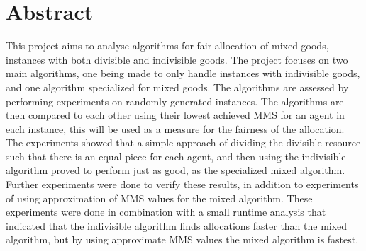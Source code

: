 \chapter{Abstract}\label{chp:abstract}

This project aims to analyse algorithms for fair allocation of mixed goods, instances with both divisible and indivisible goods. The project focuses on two main algorithms, one being made to only handle instances with indivisible goods, and one algorithm specialized for mixed goods. The algorithms are assessed by performing experiments on randomly generated instances. The algorithms are then compared to each other using their lowest achieved MMS for an agent in each instance, this will be used as a measure for the fairness of the allocation. The experiments showed that a simple approach of dividing the divisible resource such that there is an equal piece for each agent, and then using the indivisible algorithm proved to perform just as good, as the specialized mixed algorithm. Further experiments were done to verify these results, in addition to experiments of using approximation of MMS values for the mixed algorithm. These experiments were done in combination with a small runtime analysis that indicated that the indivisible algorithm finds allocations faster than the mixed algorithm, but by using approximate MMS values the mixed algorithm is fastest.
